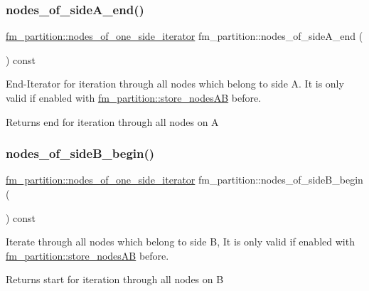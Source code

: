 \subsubsection{\texorpdfstring{nodes\+\_\+of\+\_\+side\+A\+\_\+end()}{nodes\_of\_sideA\_end()}}
{\footnotesize\ttfamily \mbox{\hyperlink{classfm__partition_ac8b7b5253476118e5f7bbad2fe8af285}{fm\+\_\+partition\+::nodes\+\_\+of\+\_\+one\+\_\+side\+\_\+iterator}} fm\+\_\+partition\+::nodes\+\_\+of\+\_\+side\+A\+\_\+end (\begin{DoxyParamCaption}{ }\end{DoxyParamCaption}) const}

End-\/\+Iterator for iteration through all nodes which belong to side {\ttfamily A}. It is only valid if enabled with \mbox{\hyperlink{classfm__partition_a8926005b4637055d2acf6f29ad2d9b97}{fm\+\_\+partition\+::store\+\_\+nodes\+AB}} before.

\begin{DoxyReturn}{Returns}
end for iteration through all nodes on {\ttfamily A} 
\end{DoxyReturn}
\mbox{\label{classfm__partition_a4e433456ed0214c04466c4f1060b0909}} 
\subsubsection{\texorpdfstring{nodes\+\_\+of\+\_\+side\+B\+\_\+begin()}{nodes\_of\_sideB\_begin()}}
{\footnotesize\ttfamily \mbox{\hyperlink{classfm__partition_ac8b7b5253476118e5f7bbad2fe8af285}{fm\+\_\+partition\+::nodes\+\_\+of\+\_\+one\+\_\+side\+\_\+iterator}} fm\+\_\+partition\+::nodes\+\_\+of\+\_\+side\+B\+\_\+begin (\begin{DoxyParamCaption}{ }\end{DoxyParamCaption}) const}

Iterate through all nodes which belong to side {\ttfamily B}, It is only valid if enabled with \mbox{\hyperlink{classfm__partition_a8926005b4637055d2acf6f29ad2d9b97}{fm\+\_\+partition\+::store\+\_\+nodes\+AB}} before.

\begin{DoxyReturn}{Returns}
start for iteration through all nodes on {\ttfamily B} 
\end{DoxyReturn}
\mbox{\label{classfm__partition_a9682b070cce104bdfe69e576df57f560}} 
